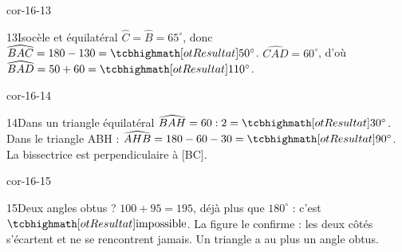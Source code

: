 \begin{blocLivre}{cor-16-13}\begin{corrige}{13}{Isocèle et équilatéral}
$\widehat{C}=\widehat{B}=65^\circ$, donc $\widehat{BAC}=180-130=\res{50^\circ}$. $\widehat{CAD}=60^\circ$, d’où $\widehat{BAD}=50+60=\res{110^\circ}$.
\label{fig-cor-16-13}
\end{corrige}\end{blocLivre}
\begin{blocLivre}{cor-16-14}\begin{corrige}{14}{Dans un triangle équilatéral}
$\widehat{BAH}=60:2=\res{30^\circ}$. Dans le triangle ABH : $\widehat{AHB}=180-60-30=\res{90^\circ}$. La bissectrice est perpendiculaire à [BC].
\label{fig-cor-16-14}
\end{corrige}\end{blocLivre}
\begin{blocLivre}{cor-16-15}\begin{corrige}{15}{Deux angles obtus ?}
$100+95=195$, déjà plus que $180^\circ$ : c’est $\res{\text{impossible}}$. La figure le confirme : les deux côtés s’écartent et ne se rencontrent jamais. Un triangle a au plus un angle obtus.
\label{fig-cor-16-15}
\end{corrige}\end{blocLivre}
